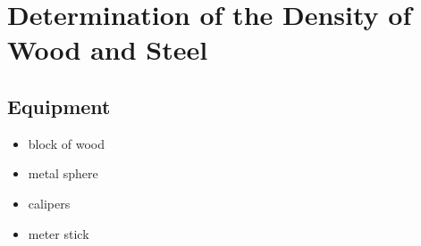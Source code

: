 %
%
%







  
\chapter{Determination of the Density of Wood and Steel}



\section{Equipment}
\begin{minipage}[t]{0.5\textwidth}
\begin{itemize}%
\item block of wood
\item metal sphere
\end{itemize}
\end{minipage}
\begin{minipage}[t]{0.5\textwidth}
\begin{itemize}%
\item calipers
\item meter stick
\end{itemize}
\end{minipage}



